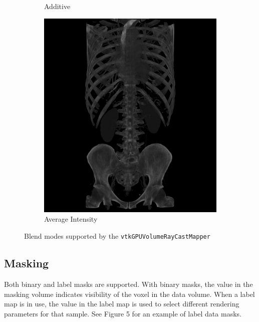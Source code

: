\begin{figure}[htb]
\begin{subfigure}{.5\columnwidth}
    \caption{Additive}
    \label{fig:blendadditive}
  \end{subfigure}%
  \begin{subfigure}{.5\columnwidth}
    \includegraphics[width=\columnwidth]{TorsoBlendingAverage.png}
    \caption{Average Intensity}
    \label{fig:blendaverage}
  \end{subfigure}
  \caption{Blend modes supported by the \texttt{vtkGPUVolumeRayCastMapper}}
  \label{fig:blendingmodes}
\end{figure}

\subsection{Masking}
\label{masking}
Both binary and label masks are supported. With binary masks, the value in the
masking volume indicates visibility of the voxel in the data volume. When a
label map is in use, the value in the label map is used to select different
rendering parameters for that sample.  See Figure 5 for an example of label data
masks.

